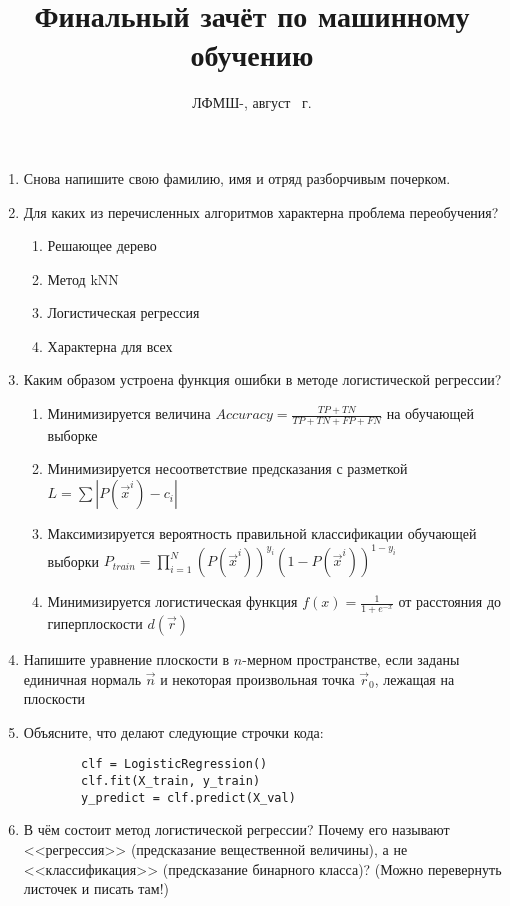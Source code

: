 \documentclass[a4paper,10pt]{article}
\title{Финальный зачёт по машинному обучению}
\date{ЛФМШ-\arabic{LFMSHnumber}, август {\the \year}~г.}
\begin{document}
\maketitle
\begin{enumerate}
	\item Снова напишите свою фамилию, имя и отряд разборчивым почерком.
	\vspace{1cm}
	\item Для каких из перечисленных алгоритмов характерна проблема переобучения?
	\begin{enumerate}
		\item Решающее дерево
		\item Метод kNN
		\item Логистическая регрессия
		\item Характерна для всех
	\end{enumerate}
	\item Каким образом устроена функция ошибки в методе логистической регрессии?
	\begin{enumerate}
		\item Минимизируется величина $Accuracy = \frac{TP+TN}{TP+TN+FP+FN}$ на обучающей выборке
		\item Минимизируется несоответствие предсказания с разметкой $L=\sum |P(\vec x^i) - c_i|$
		\item 
		\begin{sloppypar}
			Максимизируется вероятность правильной классификации обучающей выборки ${P_{train}=\prod_{i=1}^N (P(\vec x^i))^{y_i} (1 - P(\vec x^i))^{1 - y_i}}$
		\end{sloppypar}
		\item Минимизируется логистическая функция  $f(x)=\frac{1}{1+e^{-x}}$ от расстояния до гиперплоскости $d(\vec r)$
	\end{enumerate}

	
	\item
	Напишите уравнение плоскости в $n$-мерном пространстве, если заданы единичная нормаль $\vec n$ и некоторая произвольная точка $\vec r_0$, лежащая на плоскости
	\vspace{3cm}
	
	\item
	Объясните, что делают следующие строчки кода:
	\begin{verbatim}
		clf = LogisticRegression()
		clf.fit(X_train, y_train)
		y_predict = clf.predict(X_val)
	\end{verbatim}
	\vspace{5 cm}
	\item В чём состоит метод логистической регрессии? Почему его называют <<регрессия>> (предсказание вещественной величины), а не <<классификация>> (предсказание бинарного класса)? (Можно перевернуть листочек и писать там!)
	\vspace{4cm}

\end{enumerate}
\end{document}
